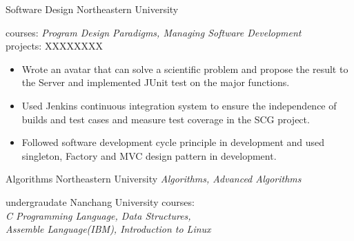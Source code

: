 \documentclass[]{ly-cv} %
\begin{document}
\begin{entrylist}
\entry
{}
{Software Design}
{Northeastern University}
{courses: \emph{Program Design Paradigms, Managing Software Development}\vspace*{4pt}\\ 
projects: XXXXXXXX
\begin{itemize}
	\item Wrote an avatar that can solve a scientific problem and propose the result to the Server and implemented JUnit test on the major functions.
	\item Used Jenkins continuous integration system to ensure the independence of builds and test cases and measure test coverage in the SCG project.
	\item Followed software development cycle principle in development and used singleton, Factory and MVC design pattern in development.
\end{itemize}}
\end{entrylist}
\begin{entrylist}
\entry
{}
{Algorithms}
{Northeastern University}
{\emph{Algorithms, Advanced Algorithms}}\\
\end{entrylist}
\begin{entrylist}
\entry
{\small{undergraudate}}
{}
{Nanchang University}
{courses: \\ \emph{C Programming Language, Data Structures,\\Assemble Language(IBM), Introduction to Linux}}
\end{entrylist}
\end{document}
